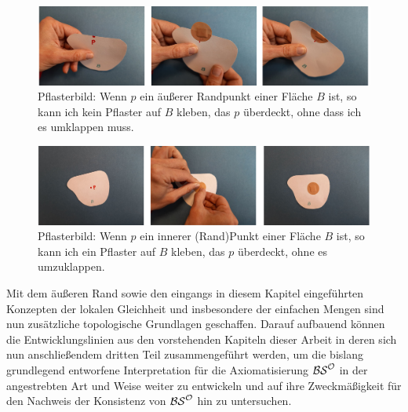     \begin{figure}[ht]
        \centering
        \includegraphics[width=\textwidth]{bearbeitet-22-04-25/pflasterbild-aeusserer-rand.png}
        \caption[Pflasterbild: äußerer Randpunkt]{Pflasterbild: Wenn $p$ ein äußerer Randpunkt einer Fläche $B$ ist, so kann ich kein Pflaster auf $B$ kleben, das $p$ überdeckt, ohne dass ich es umklappen muss.}
        \label{fig:pflasterbild-aeusserer-rand}
    \end{figure}
    
    \begin{figure}[ht]
        \centering
        \includegraphics[width=\textwidth]{bearbeitet-22-04-25/pflasterbild-innerer-pkt.png}
        \caption[Pflasterbild: innerer Punkt]{Pflasterbild: Wenn $p$ ein innerer (Rand)Punkt einer Fläche $B$ ist, so kann ich ein Pflaster auf $B$ kleben, das $p$ überdeckt, ohne es umzuklappen.}
        \label{fig:pflasterbild-innerer-pkt}
    \end{figure}
    

\bigskip
{}
Mit dem äußeren Rand sowie den eingangs in diesem Kapitel eingeführten Konzepten der lokalen Gleichheit und insbesondere der einfachen Mengen sind nun zusätzliche topologische Grundlagen geschaffen. Darauf aufbauend können die Entwicklungslinien aus den vorstehenden Kapiteln dieser Arbeit in deren sich nun anschließendem dritten Teil zusammengeführt werden, um die bislang grundlegend entworfene Interpretation für die Axiomatisierung $\mathcal{BS}^{\mathcal{O}}$ in der angestrebten Art und Weise weiter zu entwickeln und auf ihre Zweckmäßigkeit für den Nachweis der Konsistenz von $\mathcal{BS}^{\mathcal{O}}$ hin zu untersuchen.

    

